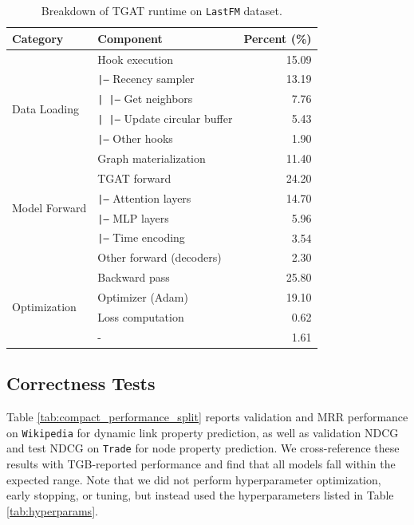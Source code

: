 
\begin{table}[ht]
\centering
\footnotesize
\caption{Breakdown of TGAT runtime on \texttt{LastFM} dataset.}
\label{tab:tgat_runtime_breakdown}
\begin{tabular}{lp{6cm}r}
\toprule
\textbf{Category} & \textbf{Component} & \textbf{Percent (\%)} \\
\midrule
\multirow{6}{*}{Data Loading} 
  & \cellcolor{rowcolor} Hook execution & \cellcolor{rowcolor}15.09 \\
  & \texttt{|--} Recency sampler & 13.19 \\
  & \texttt{|   |--} Get neighbors & 7.76 \\
  & \texttt{|   |--} Update circular buffer & 5.43 \\
  & \texttt{|--} Other hooks & 1.90 \\
  & \cellcolor{rowcolor} Graph materialization & \cellcolor{rowcolor} 11.40 \\
\midrule
\multirow{4}{*}{Model Forward} 
  & \cellcolor{rowcolor} TGAT forward & \cellcolor{rowcolor} 24.20 \\
  & \texttt{|--} Attention layers & 14.70 \\
  & \texttt{|--} MLP layers & 5.96 \\
  & \texttt{|--} Time encoding & 3.54 \\
  & \cellcolor{rowcolor} Other forward (decoders) & \cellcolor{rowcolor} 2.30 \\
\midrule
\multirow{4}{*}{Optimization} 
    & \cellcolor{rowcolor}Backward pass  & \cellcolor{rowcolor}25.80 \\
    & \cellcolor{rowcolor}Optimizer (Adam)  & \cellcolor{rowcolor} 19.10 \\
    & \cellcolor{rowcolor}Loss computation  & \cellcolor{rowcolor} 0.62 \\
\midrule
Other & - & 1.61 \\
\bottomrule
\end{tabular}
\end{table}



\subsection{Correctness Tests} \label{app:correctness}

Table \ref{tab:compact_performance_split} reports validation and MRR performance on \texttt{Wikipedia} for dynamic link property prediction, as well as validation NDCG and test NDCG on \texttt{Trade} for node property prediction. We cross-reference these results with TGB-reported performance and find that all models fall within the expected range. Note that we did not perform hyperparameter optimization, early stopping, or tuning, but instead used the hyperparameters listed in Table \ref{tab:hyperparams}.


